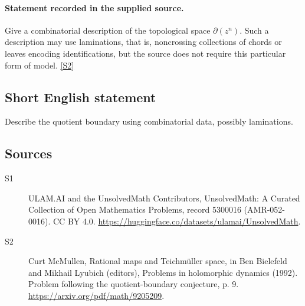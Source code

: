 \documentclass[11pt]{article}
\newcommand{\sref}[2]{\hyperlink{source:#1:#2}{[S#2]}}
\begin{document}
\paragraph{Statement recorded in the supplied source.}
Give a combinatorial description of the topological space $\partial(z^n)$. Such a description may use laminations, that is, noncrossing collections of chords or leaves encoding identifications, but the source does not require this particular form of model. \sref{5300016}{2}
\subsection{Short English statement}
Describe the quotient boundary using combinatorial data, possibly laminations.
\subsection{Sources}
\begin{description}
\item[\hypertarget{source:5300016:1}{S1}] ULAM.AI and the UnsolvedMath Contributors, UnsolvedMath: A Curated Collection of Open Mathematics Problems, record 5300016 (AMR-052-0016). CC BY 4.0. \url{https://huggingface.co/datasets/ulamai/UnsolvedMath}.
\item[\hypertarget{source:5300016:2}{S2}] Curt McMullen, Rational maps and Teichmüller space, in Ben Bielefeld and Mikhail Lyubich (editors), Problems in holomorphic dynamics (1992). Problem following the quotient-boundary conjecture, p. 9. \url{https://arxiv.org/pdf/math/9205209}.
\end{description}
\label{end:5300016}
\end{document}
